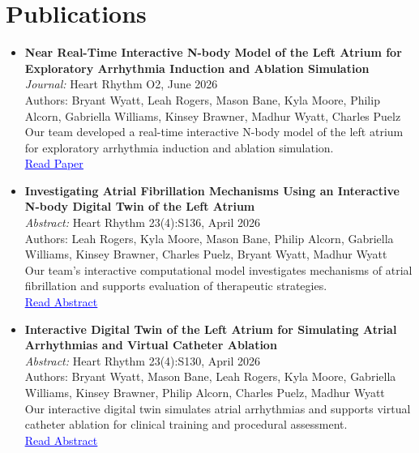 \documentclass[letterpaper,11pt]{article}
\begin{document}
\section{Publications}
  \begin{itemize}
    \item \textbf{Near Real-Time Interactive N-body Model of the Left Atrium for Exploratory Arrhythmia Induction and Ablation Simulation} \\
      \textit{Journal:} Heart Rhythm O2, June 2026 \\
      Authors: Bryant Wyatt, Leah Rogers, Mason Bane, Kyla Moore, Philip Alcorn, Gabriella Williams, Kinsey Brawner, Madhur Wyatt, Charles Puelz \\
      Our team developed a real-time interactive N-body model of the left atrium for exploratory arrhythmia induction and ablation simulation. \\
      \href{https://doi.org/10.1016/j.hroo.2026.05.020}{\textcolor{blue}{\underline{Read Paper}}}
    \item \textbf{Investigating Atrial Fibrillation Mechanisms Using an Interactive N-body Digital Twin of the Left Atrium} \\
      \textit{Abstract:} Heart Rhythm 23(4):S136, April 2026 \\
      Authors: Leah Rogers, Kyla Moore, Mason Bane, Philip Alcorn, Gabriella Williams, Kinsey Brawner, Charles Puelz, Bryant Wyatt, Madhur Wyatt \\
      Our team's interactive computational model investigates mechanisms of atrial fibrillation and supports evaluation of therapeutic strategies. \\
      \href{https://doi.org/10.1016/j.hrthm.2026.03.392}{\textcolor{blue}{\underline{Read Abstract}}}
    \item \textbf{Interactive Digital Twin of the Left Atrium for Simulating Atrial Arrhythmias and Virtual Catheter Ablation} \\
      \textit{Abstract:} Heart Rhythm 23(4):S130, April 2026 \\
      Authors: Bryant Wyatt, Mason Bane, Leah Rogers, Kyla Moore, Gabriella Williams, Kinsey Brawner, Philip Alcorn, Charles Puelz, Madhur Wyatt \\
      Our interactive digital twin simulates atrial arrhythmias and supports virtual catheter ablation for clinical training and procedural assessment. \\
      \href{https://doi.org/10.1016/j.hrthm.2026.03.378}{\textcolor{blue}{\underline{Read Abstract}}}

\end{itemize}
\end{document}
